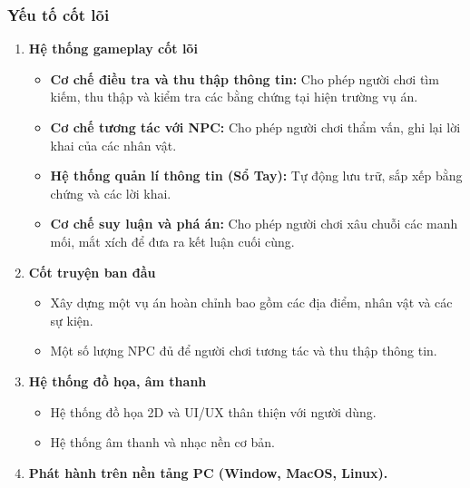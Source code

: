 \subsubsection{Yếu tố cốt lõi}
\begin{enumerate}
    \item \textbf{Hệ thống gameplay cốt lõi}
    \begin{itemize}
        \item \textbf{Cơ chế điều tra và thu thập thông tin:}
        Cho phép người chơi tìm kiếm, thu thập và kiểm tra các bằng chứng tại hiện trường vụ án.

        \item \textbf{Cơ chế tương tác với NPC:}
        Cho phép người chơi thẩm vấn, ghi lại lời khai của các nhân vật.

        \item \textbf{Hệ thống quản lí thông tin (Sổ Tay):}
        Tự động lưu trữ, sắp xếp bằng chứng và các lời khai.

        \item \textbf{Cơ chế suy luận và phá án:}
        Cho phép người chơi xâu chuỗi các manh mối, mắt xích để đưa ra kết luận cuối cùng.
    \end{itemize}

    \item \textbf{Cốt truyện ban đầu}
    \begin{itemize}
        \item Xây dựng một vụ án hoàn chỉnh bao gồm các địa điểm, nhân vật và các sự kiện.
        
        \item Một số lượng NPC đủ để người chơi tương tác và thu thập thông tin.
    \end{itemize}

    \item \textbf{Hệ thống đồ họa, âm thanh}
    \begin{itemize}
        \item Hệ thống đồ họa 2D và UI/UX thân thiện với người dùng.

        \item Hệ thống âm thanh và nhạc nền cơ bản.
    \end{itemize}

    \item \textbf{Phát hành trên nền tảng PC (Window, MacOS, Linux).}
\end{enumerate}

